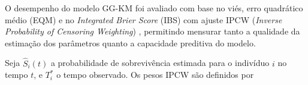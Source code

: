 








O desempenho do modelo GG-KM foi avaliado com base no viés, erro quadrático médio (EQM) e no \textit{Integrated Brier Score} (IBS) com ajuste IPCW (\textit{Inverse Probability of Censoring Weighting}) \cite{dong2020inverse}, permitindo mensurar tanto a qualidade da estimação dos parâmetros quanto a capacidade preditiva do modelo.

Seja $\hat{S}_i(t)$ a probabilidade de sobrevivência estimada para o indivíduo $i$ no tempo $t$, e $T_i^*$ o tempo observado. Os pesos IPCW são definidos por


